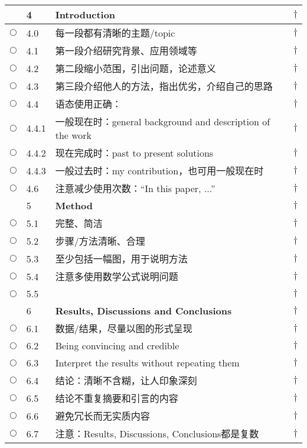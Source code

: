 \documentclass{ctexart}
\begin{document}
\begin{center}
\begin{longtable}{|l|l|p{}|l|}
 & 4 & \textcolor[rgb]{0.00,0.00,1.00}{\textbf{Introduction}}& $\dagger$\\\hline
$\bigcirc$& 4.0 & 每一段都有清晰的主题/topic & $\dagger$\\\hline
$\bigcirc$& 4.1 & 第一段介绍研究背景、应用领域等 & $\dagger$\\\hline
$\bigcirc$& 4.2 & 第二段缩小范围，引出问题，论述意义 & $\dagger$\\\hline
$\bigcirc$& 4.3 & 第三段介绍他人的方法，指出优劣，介绍自己的思路 & $\dagger$\\\hline
$\bigcirc$& 4.4 & 语态使用正确： & $\dagger$\\\hline
$\bigcirc$& 4.4.1 & 一般现在时：general background and description of the work & $\dagger$\\\hline
$\bigcirc$& 4.4.2 & 现在完成时：past to present solutions& $\dagger$\\\hline
$\bigcirc$& 4.4.3 & 一般过去时：my contribution，也可用一般现在时& $\dagger$\\\hline
$\bigcirc$& 4.6 & 注意减少使用次数：“In this paper, ...” & $\dagger$\\\hline
\hline
 & 5 & \textcolor[rgb]{0.00,0.00,1.00}{\textbf{Method}}& $\dagger$\\\hline
$\bigcirc$& 5.1 & 完整、简洁 & $\dagger$\\\hline
$\bigcirc$& 5.2 & 步骤/方法清晰、合理 & $\dagger$\\\hline
$\bigcirc$& 5.3 & 至少包括一幅图，用于说明方法 & $\dagger$\\\hline
$\bigcirc$& 5.4 & 注意多使用数学公式说明问题 & $\dagger$\\\hline
$\bigcirc$& 5.5 &  & $\dagger$\\\hline
\hline

 & 6 & \textcolor[rgb]{0.00,0.00,1.00}{\textbf{Results, Discussions and Conclusions}}& $\dagger$\\\hline
$\bigcirc$& 6.1 & 数据/结果，尽量以图的形式呈现 & $\dagger$\\\hline
$\bigcirc$& 6.2 & Being convincing and credible & $\dagger$\\\hline
$\bigcirc$& 6.3 & Interpret the results without repeating them & $\dagger$\\\hline
$\bigcirc$& 6.4 & 结论：清晰不含糊，让人印象深刻 & $\dagger$\\\hline
$\bigcirc$& 6.5 & 结论不重复摘要和引言的内容 & $\dagger$\\\hline
$\bigcirc$& 6.6 & 避免冗长而无实质内容 & $\dagger$\\\hline
$\bigcirc$& 6.7 & 注意：Results, Discussions, Conclusions都是复数 & $\dagger$\\\hline
\hline


\end{longtable}
\end{center}
\end{document}
